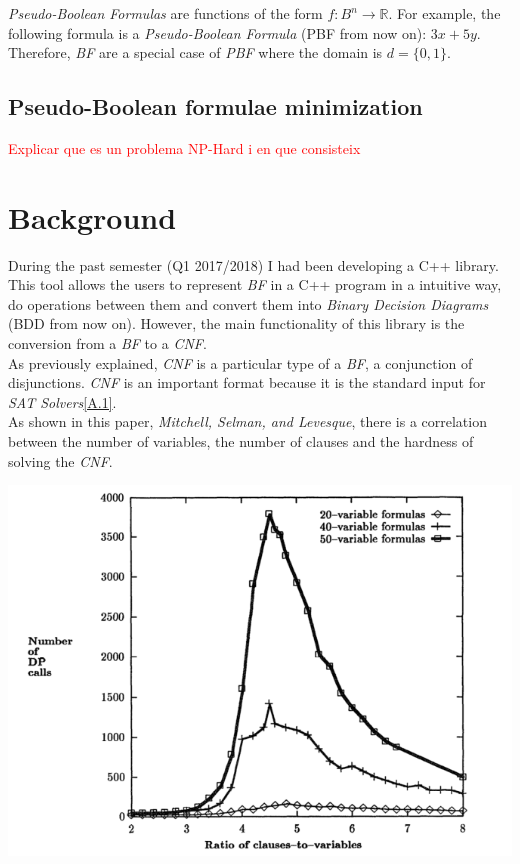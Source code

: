 \emph{Pseudo-Boolean Formulas} are functions of the form $f:B^n \rightarrow \mathbb{R}$. For example, the following formula is a \emph{Pseudo-Boolean Formula} (PBF from now on): $3x+5y$. Therefore, \emph{BF} are a special case of \emph{PBF} where the domain is $d=\{0,1\}$.


\subsection{Pseudo-Boolean formulae minimization}
\textcolor{red}{Explicar que es un problema NP-Hard i en que consisteix}

\section{Background}

During the past semester (Q1 2017/2018) I had been developing a C++ library.\\
This tool allows the users to represent \emph{BF} in a C++ program in a intuitive way, do operations between them and convert them into \emph{Binary Decision Diagrams} (BDD from now on). However, the main functionality of this library is the conversion from a \emph{BF} to a \emph{CNF}.  \\
As previously explained, \emph{CNF} is a particular type of a \emph{BF}, a conjunction of disjunctions. \emph{CNF} is an important format because it is the standard input for \emph{SAT Solvers}\ref{A.1}.\\
As shown in this paper, \emph{Mitchell, Selman, and Levesque\cite{Mitchell}}, there is a correlation between the number of variables, the number of clauses and the hardness of solving the \emph{CNF}.
\begin{center}
	\includegraphics[width=1\textwidth]{Figures/GraphMitchellSelmanLevesque.png}
\end{center}
